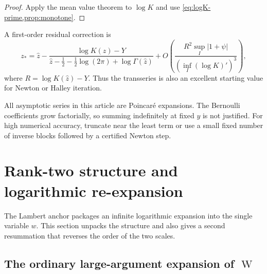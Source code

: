 \documentclass[11pt,oneside]{article}
\theoremstyle{plain}
\theoremstyle{definition}
\theoremstyle{remark}
\newcommand{\W}{\operatorname{W}}
\begin{document}
\begin{proof}
Apply the mean value theorem to \(\log K\) and use
\cref{eq:logK-prime,prop:monotone}.
\end{proof}

A first-order residual correction is
\begin{equation}
 z_*=\widehat z-
 \frac{\log K(\widehat z)-Y}
 {\widehat z-\frac12-\frac12\log(2\pi)+\log\Gamma(\widehat z)}
 +O\!\left(
   \frac{R^2\sup_I|1+\psi|}{(\inf_I(\log K)')^3}
 \right),
 \label{eq:Newton-residual}
\end{equation}
where \(R=\log K(\widehat z)-Y\).  Thus the transseries is also an excellent
starting value for Newton or Halley iteration.

\begin{warningbox}
All asymptotic series in this article are Poincar\'e expansions.  The Bernoulli
coefficients grow factorially, so summing indefinitely at fixed \(y\) is not
justified.  For high numerical accuracy, truncate near the least term or use a
small fixed number of inverse blocks followed by a certified Newton step.
\end{warningbox}

\section{Rank-two structure and logarithmic re-expansion}
\label{sec:rank-two}

The Lambert anchor packages an infinite logarithmic expansion into the single
variable \(w\).  This section unpacks the structure and also gives a second
resummation that reverses the order of the two scales.

\subsection{The ordinary large-argument expansion of \(\W\)}
\end{document}
